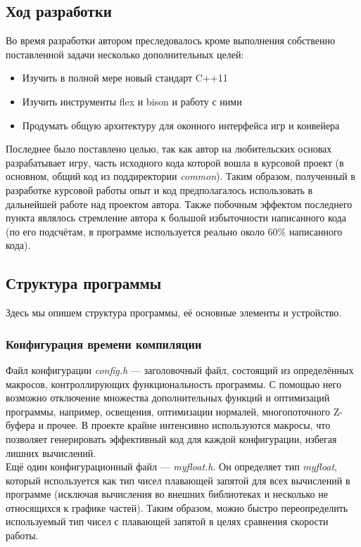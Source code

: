 \documentclass[a4paper,12pt]{report}
\numberwithin{equation}{section}
\begin{document}
\subsection{Ход разработки}
Во время разработки автором преследовалось кроме выполнения собственно поставленной задачи несколько дополнительных целей:
\begin{itemize}
\item Изучить в полной мере новый стандарт C++11
\item Изучить инструменты flex и bison и работу с ними
\item Продумать общую архитектуру для оконного интерфейса игр и конвейера
\end{itemize}
Последнее было поставлено целью, так как автор на любительских основах разрабатывает игру, часть исходного кода которой вошла в курсовой проект (в основном, общий код из поддиректории \textit{common}). Таким образом, полученный в разработке курсовой работы опыт и код предполагалось использовать в дальнейшей работе над проектом автора. Также побочным эффектом последнего пункта являлось стремление автора к большой избыточности написанного кода (по его подсчётам, в программе используется реально около 60\% написанного кода).

\subsection{Структура программы}
Здесь мы опишем структура программы, её основные элементы и устройство.

\subsubsection{Конфигурация времени компиляции}
Файл конфигурации \textit{config.h} --- заголовочный файл, состоящий из определённых макросов, контроллирующих функциональность программы. С помощью него возможно отключение множества дополнительных функций и оптимизаций программы, например, освещения, оптимизации нормалей, многопоточного Z-буфера и прочее. В проекте крайне интенсивно используются макросы, что позволяет генерировать эффективный код для каждой конфигурации, избегая лишних вычислений. \\
Ещё один конфигурационный файл --- \textit{myfloat.h}. Он определяет тип \textit{myfloat}, который используется как тип чисел плавающей запятой для всех вычислений в программе (исключая вычисления во внешних библиотеках и несколько не относящихся к графике частей). Таким образом, можно быстро переопределить используемый тип чисел с плавающей запятой в целях сравнения скорости работы.
\end{document}
